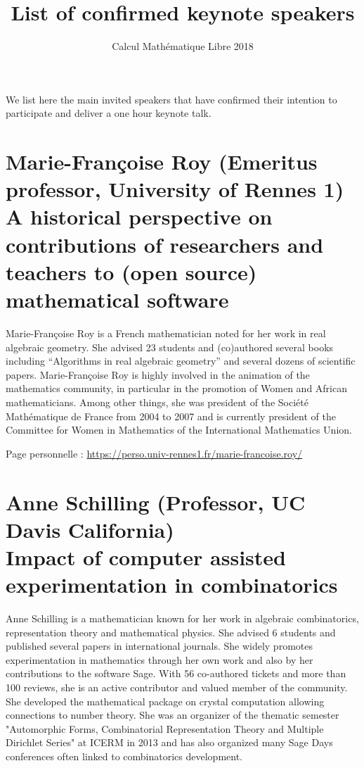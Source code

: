 \documentclass{paper}
\title{List of confirmed keynote speakers}
\subtitle{Calcul Mathématique Libre 2018}
\date{}
\newcommand{\orateur}[3]{%
  \section*{%
    #1 {\small(#2)}\nopagebreak\\
    #3}
}
\begin{document}
\maketitle
\thispagestyle{empty}

We list here the main invited speakers that have confirmed their
intention to participate and deliver a one hour keynote talk.



\orateur
{Marie-Françoise Roy}
{Emeritus professor, University of Rennes 1}
{A historical perspective on contributions of researchers and teachers
  to (open source) mathematical software}

Marie-Françoise Roy is a French mathematician noted for her work in
real algebraic geometry. She advised 23 students and (co)authored
several books including ``Algorithms in real algebraic geometry'' and
several dozens of scientific papers. Marie-Françoise Roy is highly
involved in the animation of the mathematics community, in particular
in the promotion of Women and African mathematicians. Among other
things, she was president of the Société Mathématique de France from
2004 to 2007 and is currently president of the Committee for Women in
Mathematics of the International Mathematics Union.

\medskip

Page personnelle : \url{https://perso.univ-rennes1.fr/marie-francoise.roy/}

\orateur
{Anne Schilling}
{Professor, UC Davis California}
{Impact of computer assisted experimentation in combinatorics}

Anne Schilling is a mathematician known for her work in algebraic combinatorics, 
representation theory and mathematical physics. She advised 6 students and published
several papers in international journals. She widely promotes experimentation 
in mathematics through her own work and also by her contributions to
the software Sage. With 56 co-authored tickets and more than 100 reviews, she
is an active contributor and valued member of the community. She developed 
the mathematical package on crystal computation allowing connections to number
theory. She was an organizer of the thematic semester "Automorphic Forms, 
Combinatorial Representation Theory and Multiple Dirichlet Series" at ICERM
in 2013 and has also organized many Sage Days conferences often linked to 
combinatorics development.
\end{document}
